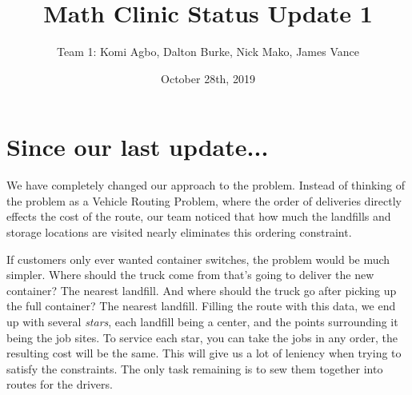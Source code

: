 \documentclass{article}
\title{Math Clinic Status Update 1}
\author{Team 1: Komi Agbo, Dalton Burke, Nick Mako, James Vance}
\date{October 28th, 2019}
\begin{document}
\maketitle

\section{Since our last update...}
We have completely changed our approach to the problem. Instead of thinking of
the problem as a Vehicle Routing Problem, where the order of deliveries directly
effects the cost of the route, our team noticed that how much the landfills and
storage locations are visited nearly eliminates this ordering constraint.

If customers only ever wanted container switches, the problem would be much
simpler. Where should the truck come from that's going to deliver the new
container? The nearest landfill. And where should the truck go after picking up
the full container? The nearest landfill. Filling the route with this data, we
end up with several \emph{stars}, each landfill being a center, and the points
surrounding it being the job sites. To service each star, you can take the jobs
in any order, the resulting cost will be the same. This will give us a lot of
leniency when trying to satisfy the constraints. The only task remaining is to
sew them together into routes for the drivers.
\end{document}
